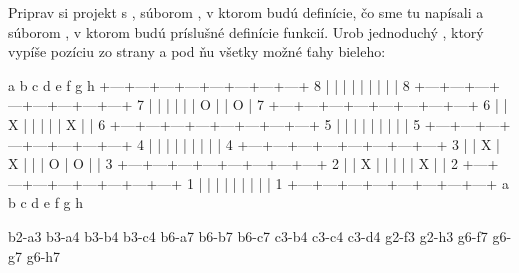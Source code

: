\def\ulohaTarget{Dir}
\begin{uloha}
  \label{uloha:btr1}
  Priprav si projekt s , súborom , v ktorom budú definície, čo sme tu napísali a súborom , v ktorom budú
  príslušné definície funkcií. Urob jednoduchý , ktorý vypíše pozíciu zo strany \pageref{pg:breaktru:def} a pod ňu všetky možné ťahy bieleho:
\end{uloha}

\begin{outputBox}
    a   b   c   d   e   f   g   h
  +---+---+---+---+---+---+---+---+
8 |   |   |   |   |   |   |   |   | 8
  +---+---+---+---+---+---+---+---+
7 |   |   |   |   |   | O |   | O | 7
  +---+---+---+---+---+---+---+---+
6 |   | X |   |   |   |   | X |   | 6
  +---+---+---+---+---+---+---+---+
5 |   |   |   |   |   |   |   |   | 5
  +---+---+---+---+---+---+---+---+
4 |   |   |   |   |   |   |   |   | 4
  +---+---+---+---+---+---+---+---+
3 |   | X | X |   |   | O | O |   | 3
  +---+---+---+---+---+---+---+---+
2 |   | X |   |   |   |   | X |   | 2
  +---+---+---+---+---+---+---+---+
1 |   |   |   |   |   |   |   |   | 1
  +---+---+---+---+---+---+---+---+
    a   b   c   d   e   f   g   h

b2-a3  b3-a4  b3-b4  b3-c4  b6-a7  
b6-b7  b6-c7  c3-b4  c3-c4  c3-d4  
g2-f3  g2-h3  g6-f7  g6-g7  g6-h7
\end{outputBox}



